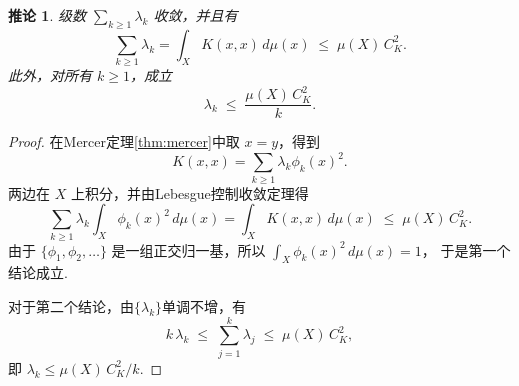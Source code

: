 \documentclass[12pt, a4paper, oneside]{ctexbook}
\newtheorem{corollary}[theorem]{推论}
\begin{document}
\begin{corollary}
级数 $\sum_{k\geq 1}\lambda_k$ 收敛，并且有
\[
\sum_{k\geq 1}\lambda_k
= \int_X K(x,x)\,d\mu(x)
\;\leq\; \mu(X)\,C_K^2.
\]
此外，对所有 $k\geq 1$，成立
\[
\lambda_k \;\leq\; \frac{\mu(X)\,C_K^2}{k}.
\]
\end{corollary}

\begin{proof}
在Mercer定理\ref{thm:mercer}中取 $x=y$，得到
\[
K(x,x)=\sum_{k\geq 1}\lambda_k \phi_k(x)^2.
\]
两边在 $X$ 上积分，并由Lebesgue控制收敛定理得
\[
\sum_{k\geq 1}\lambda_k\int_X \phi_k(x)^2\,d\mu(x)
=\int_X K(x,x)\,d\mu(x)
\;\leq\;\mu(X)\,C_K^2.
\]
由于 $\{\phi_1,\phi_2,\dots\}$ 是一组正交归一基，所以
\(\int_X \phi_k(x)^2\,d\mu(x)=1\)，
于是第一个结论成立.

对于第二个结论，由$\{\lambda_k\}$单调不增，有
\[
k\,\lambda_k \;\leq\;\sum_{j=1}^k \lambda_j
\;\leq\;\mu(X)\,C_K^2,
\]
即
\(\lambda_k \leq \mu(X)\,C_K^2/k\).
\end{proof}
\end{document}
